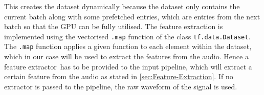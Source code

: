 \newline
\newline
This creates the dataset dynamically because the dataset only contains the current batch along with some prefetched entries, which are entries from the next batch so that the \gls{GPU} can be fully utilised.
\newline
\newline
The feature extraction is implemented using the vectorised \texttt{.map} function of the class \texttt{tf.data.Dataset}\footnotemark. The \texttt{.map} function applies a given function to each element within the dataset, which in our case will be used to extract the features from the audio. Hence a \flqq feature extractor\frqq \ has to be provided to the input pipeline, which will extract a certain feature from the audio as stated in \ref{sec:Feature-Extraction}. If no extractor is passed to the pipeline, the raw waveform of the signal is used.
